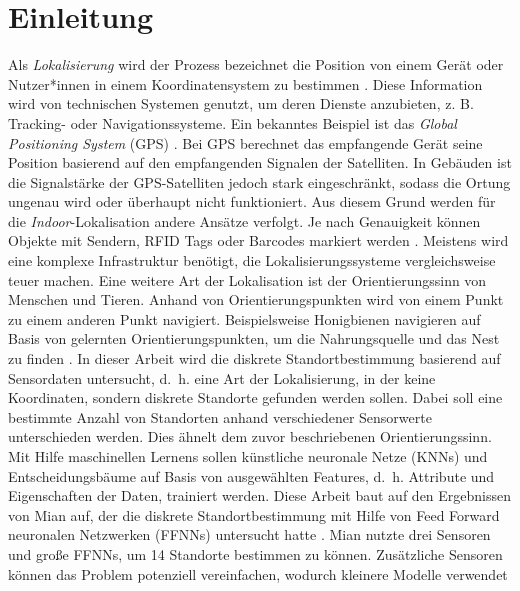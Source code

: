 \chapter{Einleitung}
Als \textit{Lokalisierung} wird der Prozess bezeichnet die Position von einem Gerät oder Nutzer*innen in einem Koordinatensystem zu bestimmen \cite{bulusu2000gps}.
Diese Information wird von technischen Systemen genutzt, um deren Dienste anzubieten, z. B. Tracking- oder Navigationssysteme.
Ein bekanntes Beispiel ist das \textit{Global Positioning System} (GPS) \cite{kaplan2005understanding}.
Bei GPS berechnet das empfangende Gerät seine Position basierend auf den empfangenden Signalen der Satelliten.
\newline
\newline
In Gebäuden ist die Signalstärke der GPS-Satelliten jedoch stark eingeschränkt, sodass die Ortung ungenau wird oder überhaupt nicht funktioniert.
Aus diesem Grund werden für die \textit{Indoor}-Lokalisation andere Ansätze verfolgt.
Je nach Genauigkeit können Objekte mit Sendern, RFID Tags oder Barcodes markiert werden \cite{xiao2016survey}.
Meistens wird eine komplexe Infrastruktur benötigt, die Lokalisierungssysteme vergleichsweise teuer machen.
\newline
\newline
Eine weitere Art der Lokalisation ist der Orientierungssinn von Menschen und Tieren.
Anhand von Orientierungspunkten wird von einem Punkt zu einem anderen Punkt navigiert.
Beispielsweise Honigbienen navigieren auf Basis von gelernten Orientierungspunkten, um die Nahrungsquelle und das Nest zu finden \cite{menzel1996knowledge}.
\newline
\newline
In dieser Arbeit wird die diskrete Standortbestimmung basierend auf Sensordaten untersucht,
d.~h. eine Art der Lokalisierung, in der keine Koordinaten, sondern diskrete Standorte gefunden werden sollen.
Dabei soll eine bestimmte Anzahl von Standorten anhand verschiedener Sensorwerte unterschieden werden.
Dies ähnelt dem zuvor beschriebenen Orientierungssinn.
Mit Hilfe maschinellen Lernens sollen künstliche neuronale Netze (KNNs) und Entscheidungsbäume
auf Basis von ausgewählten Features, d.~h. Attribute und Eigenschaften der Daten, trainiert werden.
Diese Arbeit baut auf den Ergebnissen von Mian auf, der die diskrete Standortbestimmung mit Hilfe von
Feed Forward neuronalen Netzwerken (FFNNs) untersucht hatte \cite{naveedThesis}.
\newpage
Mian nutzte drei Sensoren und große FFNNs, um 14 Standorte bestimmen zu können.
Zusätzliche Sensoren können das Problem potenziell vereinfachen, wodurch kleinere Modelle verwendet
